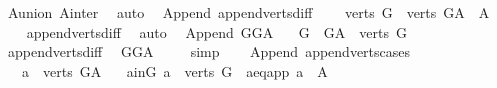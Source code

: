 \begin{isabellebody}
\isamarkupfalse%
\ A{\isacharunderscore}{\kern0pt}union\ A{\isacharunderscore}{\kern0pt}inter\ \isamarkupfalse%
\ auto%
\endisatagproof
{\isafoldproof}%
%
\isadelimproof
\isanewline
%
\endisadelimproof
\isanewline
\isanewline
{}\isamarkupfalse%
\ {\isacharparenleft}{\kern0pt}\ Append{\isacharparenright}{\kern0pt}\ append{\isacharunderscore}{\kern0pt}verts{\isacharunderscore}{\kern0pt}diff{\isacharprime}{\kern0pt}{\isacharcolon}{\kern0pt}\ \isanewline
\ \ \ {\isachardoublequoteopen}verts\ G\ {\isacharequal}{\kern0pt}\ verts\ G{\isacharunderscore}{\kern0pt}A\ {\isacharminus}{\kern0pt}\ A{\isachardoublequoteclose}\isanewline
%
\isadelimproof
\ \ %
\endisadelimproof
%
\isatagproof
{}\isamarkupfalse%
\ append{\isacharunderscore}{\kern0pt}verts{\isacharunderscore}{\kern0pt}diff\ \isamarkupfalse%
\ auto%
\endisatagproof
{\isafoldproof}%
%
\isadelimproof
\isanewline
%
\endisadelimproof
\isanewline
{}\isamarkupfalse%
\ {\isacharparenleft}{\kern0pt}\ Append{\isacharparenright}{\kern0pt}\ GG{\isacharunderscore}{\kern0pt}A{\isacharprime}{\kern0pt}{\isacharcolon}{\kern0pt}\isanewline
\ \ \ {\isachardoublequoteopen}G\ {\isacharequal}{\kern0pt}\ G{\isacharunderscore}{\kern0pt}A\ {\isasymrestriction}\ {\isacharparenleft}{\kern0pt}verts\ G{\isacharparenright}{\kern0pt}{\isachardoublequoteclose}\isanewline
%
\isadelimproof
\ \ %
\endisadelimproof
%
\isatagproof
{}\isamarkupfalse%
\ append{\isacharunderscore}{\kern0pt}verts{\isacharunderscore}{\kern0pt}diff{\isacharprime}{\kern0pt}\ \isamarkupfalse%
\ GG{\isacharunderscore}{\kern0pt}A\ \isanewline
\ \ \isamarkupfalse%
\ simp%
\endisatagproof
{\isafoldproof}%
%
\isadelimproof
\ \isanewline
%
\endisadelimproof
\isanewline
{}\isamarkupfalse%
\ {\isacharparenleft}{\kern0pt}\ Append{\isacharparenright}{\kern0pt}\ append{\isacharunderscore}{\kern0pt}verts{\isacharunderscore}{\kern0pt}cases{\isacharcolon}{\kern0pt}\ \isanewline
\ \ \ {\isachardoublequoteopen}a\ {\isasymin}\ verts\ G{\isacharunderscore}{\kern0pt}A{\isachardoublequoteclose}\isanewline
\ \ \ {\isacharparenleft}{\kern0pt}a{\isacharunderscore}{\kern0pt}in{\isacharunderscore}{\kern0pt}G{\isacharparenright}{\kern0pt}\ {\isachardoublequoteopen}a\ {\isasymin}\ verts\ G{\isachardoublequoteclose}\ {\isacharbar}{\kern0pt}\ {\isacharparenleft}{\kern0pt}a{\isacharunderscore}{\kern0pt}eq{\isacharunderscore}{\kern0pt}app{\isacharparenright}{\kern0pt}\ {\isachardoublequoteopen}a\ {\isasymin}\ A{\isachardoublequoteclose}\isanewline

\end{isabellebody}
